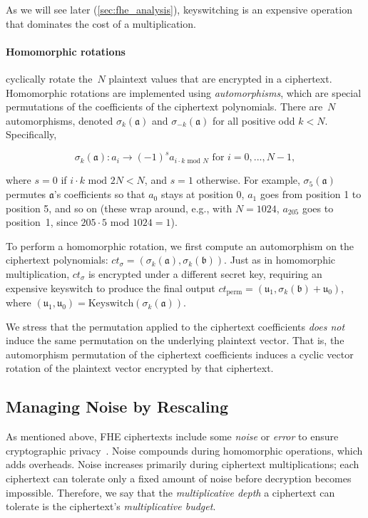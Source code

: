 As we will see later (\autoref{sec:fhe_analysis}), keyswitching is an
expensive operation that dominates the cost of a multiplication.

\paragraph{Homomorphic rotations} cyclically rotate the~$N$ plaintext values
that are encrypted in a ciphertext. Homomorphic rotations are
implemented using \emph{automorphisms}, which are special permutations of the
coefficients of the ciphertext polynomials.  There are~$N$ automorphisms,
denoted
$\sigma_k(\mathfrak{a})$ and $\sigma_{-k}(\mathfrak{a})$ for all
positive odd $k<N$. Specifically,

\begin{equation*}
  \sigma_k(\mathfrak{a}): a_i \rightarrow (-1)^{s} a_{i \cdot k \textrm{ mod } N} \text{ for } i=0,...,N-1,
\end{equation*}

where $s=0$ if $i \cdot k \textrm{ mod } 2N < N$, and $s=1$ otherwise. For example,
$\sigma_{5}(\mathfrak{a})$ permutes $\mathfrak{a}$'s coefficients so that $a_0$
stays at position 0, $a_1$ goes from position 1 to position 5, and so on (these
wrap around, e.g., with $N=1024$, $a_{205}$ goes to position~1, since
$205\cdot5 \textrm{ mod } 1024 = 1$).

To perform a homomorphic rotation, we first compute an automorphism on the
ciphertext polynomials: $ct_{\sigma} = (\sigma_k(\mathfrak{a}),
\sigma_k(\mathfrak{b}))$. Just as in homomorphic multiplication, $ct_{\sigma}$
is encrypted under a different secret key, requiring an expensive keyswitch to
produce the final output $ct_{\text{perm}} = (\mathfrak{u}_1,
\sigma_{k}(\mathfrak{b}) + \mathfrak{u}_0)$, where $(\mathfrak{u}_1,
\mathfrak{u}_0) = \text{Keyswitch}(\sigma_k (\mathfrak{a}))$.

We stress that the permutation applied to the ciphertext coefficients
\emph{does not} induce the same permutation on the underlying plaintext vector.
That is, the automorphism permutation of the ciphertext coefficients induces a
cyclic vector rotation of the plaintext vector encrypted by that ciphertext.


\subsection{Managing Noise by Rescaling}
\label{sec:noisemgmt}

As mentioned above, FHE ciphertexts include some
\emph{noise} or \emph{error} to ensure
cryptographic privacy~\cite{lyubashevsky:tact10:ideal}. Noise compounds during
homomorphic operations, which adds overheads. Noise increases primarily during
ciphertext multiplications; each ciphertext can tolerate only a fixed amount of
noise before decryption becomes impossible. Therefore, we say that the
\emph{multiplicative depth} a ciphertext can tolerate is the ciphertext's
\emph{multiplicative budget}.

